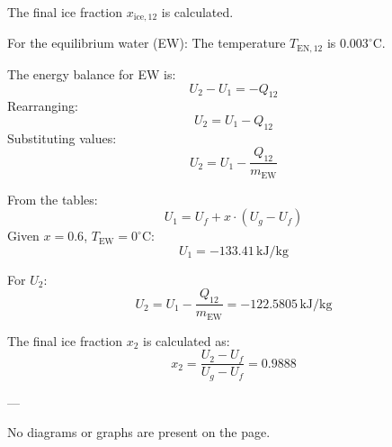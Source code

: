 The final ice fraction \( x_{\text{ice},12} \) is calculated.  

For the equilibrium water (EW):  
The temperature \( T_{\text{EN},12} \) is \( 0.003^\circ\text{C} \).  

The energy balance for EW is:  
\[
U_2 - U_1 = -Q_{12}
\]  
Rearranging:  
\[
U_2 = U_1 - Q_{12}
\]  
Substituting values:  
\[
U_2 = U_1 - \frac{Q_{12}}{m_{\text{EW}}}
\]  

From the tables:  
\[
U_1 = U_f + x \cdot (U_g - U_f)
\]  
Given \( x = 0.6 \), \( T_{\text{EW}} = 0^\circ\text{C} \):  
\[
U_1 = -133.41 \, \text{kJ/kg}
\]  

For \( U_2 \):  
\[
U_2 = U_1 - \frac{Q_{12}}{m_{\text{EW}}} = -122.5805 \, \text{kJ/kg}
\]  

The final ice fraction \( x_2 \) is calculated as:  
\[
x_2 = \frac{U_2 - U_f}{U_g - U_f} = 0.9888
\]  

---

No diagrams or graphs are present on the page.
